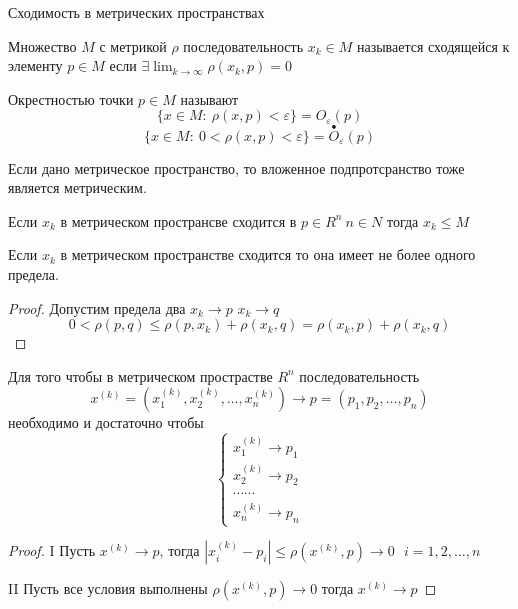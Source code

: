\begin{title}[\Large]
  Сходимость в метрических пространствах
\end{title}

\begin{define}
  Множество $M$ с метрикой $\rho$ последовательность $x_k \in M$ называется
  сходящейся к элементу $p \in M$ если $\exists \lim_{k \to \infty} \rho(x_k, p)
  = 0$
\end{define}

\begin{define}
  Окрестностью точки $p \in M$ называют
  $$
  \{ x \in M: ~ \rho(x, p) < \varepsilon \} = O_{\varepsilon}(p)
  $$
  $$
  \{ x \in M: ~ 0 < \rho(x, p) < \varepsilon \} =
  \stackrel{\bullet}{O}_{\varepsilon}(p)
  $$
\end{define}

Если дано метрическое пространство, то вложенное подпротсранство тоже является
метрическим.

\begin{theorem}
  Если $x_k$ в метрическом пространсве сходится в $p \in R^n ~ n \in N$ тогда
  $x_k \le M$
\end{theorem}

\begin{theorem}
  Если $x_k$ в метрическом пространстве сходится то она имеет не более одного
  предела.
\end{theorem}

\begin{proof}
  Допустим предела два $x_k \to p$ $x_k \to q$
  $$
  0 < \rho(p, q) \le \rho(p, x_k) + \rho(x_k, q) = \rho(x_k, p) + \rho(x_k, q)
  $$
\end{proof}

\begin{block}
  Для того чтобы в метрическом прострастве $R^n$ последовательность
  $$
  x^{(k)} = (x_1^{(k)}, x_2^{(k)}, \ldots, x_n^{(k)}) \to
  p = (p_1, p_2, \ldots, p_n)
  $$
  необходимо и достаточно чтобы
  $$
  \left\{
  \begin{array}{c}
    x_1^{(k)} \to p_1 \\
    x_2^{(k)} \to p_2 \\
    \cdots \cdots \\
    x_n^{(k)} \to p_n
  \end{array}
  \right.
  $$
\end{block}

\begin{proof}
  I Пусть $x^{(k)} \to p$, тогда $|x_i^{(k)} - p_i| \le \rho(x^{(k)}, p) \to 0
  ~~~ i = 1, 2, \ldots, n$

  II Пусть все условия выполнены $\rho(x^{(k)}, p) \to 0$ тогда $x^{(k)} \to p$
\end{proof}

